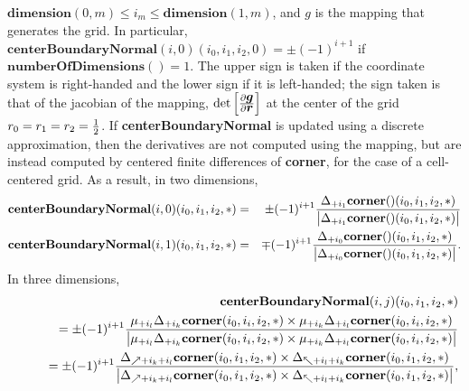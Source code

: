 \documentclass{article}
\begin{document}
    $\textbf{dimension}(0,m) \le i_m \le \textbf{dimension}(1,m)$, and {\boldmath $g$} is the mapping that generates the grid.
    In particular, $\textbf{centerBoundaryNormal}(i,0)(i_0,i_1,i_2,0)=\pm(-1)^{i+1}$ if $\textbf{numberOfDimensions}()=1$.
    The upper sign is taken if the coordinate system is right-handed and the lower sign if it is left-handed;
    the sign taken is that of the jacobian of the mapping, $\det\Big[{\partial\mbox{\boldmath$g$} \over \partial\mbox{\boldmath$r$}}\Big]$
    at the center of the grid $r_0=r_1=r_2={1\over2}$.
    If \textbf{centerBoundaryNormal} is updated using a discrete approximation, then the derivatives are not computed using the mapping, but are
    instead computed by centered finite differences of \textbf{corner}, for the case of a cell-centered grid.  As a result, in two dimensions,
    \begin{eqnarray*}
      \textbf{centerBoundaryNormal}(i,0)(i_0,i_1,i_2,\ast) & = & \pm (-1)^{i+1} {\Delta_{+i_1} \textbf{corner}()(i_0,i_1,i_2,\ast) \over
                                                                              \big| \Delta_{+i_1} \textbf{corner}()(i_0,i_1,i_2,\ast) \big|}  \\
      \textbf{centerBoundaryNormal}(i,1)(i_0,i_1,i_2,\ast) & = & \mp (-1)^{i+1} {\Delta_{+i_0} \textbf{corner}()(i_0,i_1,i_2,\ast) \over
                                                                              \big| \Delta_{+i_0} \textbf{corner}()(i_0,i_1,i_2,\ast) \big|}. \\
    \end{eqnarray*}
    In three dimensions,
    \begin{eqnarray*}
      && \textbf{centerBoundaryNormal}(i,j)(i_0,i_1,i_2,\ast) \\
      && \qquad = \pm (-1)^{i+1}
            {\mu_{+i_l} \Delta_{+i_k}  \textbf{corner}(i_0,i_i,i_2,\ast) \times \mu_{+i_k} \Delta_{+i_l}  \textbf{corner}(i_0,i_i,i_2,\ast) \over
       \big| \mu_{+i_l} \Delta_{+i_k}  \textbf{corner}(i_0,i_i,i_2,\ast) \times \mu_{+i_k} \Delta_{+i_l}  \textbf{corner}(i_0,i_i,i_2,\ast) \big|}  \\
      && \qquad = \pm (-1)^{i+1}
            {\Delta_{\nearrow+i_k+i_l} \textbf{corner}(i_0,i_1,i_2,\ast) \times \Delta_{\nwarrow+i_l+i_k} \textbf{corner}(i_0,i_1,i_2,\ast) \over
       \big| \Delta_{\nearrow+i_k+i_l} \textbf{corner}(i_0,i_1,i_2,\ast) \times \Delta_{\nwarrow+i_l+i_k} \textbf{corner}(i_0,i_1,i_2,\ast) \big|}, \\
    \end{eqnarray*}
\end{document}
